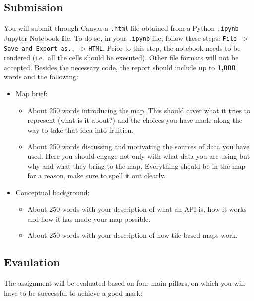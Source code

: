 \documentclass[
  letterpaper,
  DIV=11,
  numbers=noendperiod]{scrreprt}
\providecommand{\tightlist}{%
  \setlength{\itemsep}{0pt}\setlength{\parskip}{0pt}}\usepackage{longtable,booktabs,array}
\begin{document}
\subsection*{Submission}\label{submission}

You will submit through Canvas a \texttt{.html} file obtained from a
Python \texttt{.ipynb} Jupyter Notebook file. To do so, in your
\texttt{.ipynb} file, follow these steps: \texttt{File} --\textgreater{}
\texttt{Save\ and\ Export\ as..} --\textgreater{} \texttt{HTML}. Prior
to this step, the notebook needs to be rendered (i.e.~all the cells
should be executed). Other file formats will not be accepted. Besides
the necessary code, the report should include up to \textbf{1,000} words
and the following:

\begin{itemize}
\item
  Map brief:

  \begin{itemize}
  \tightlist
  \item
    About 250 words introducing the map. This should cover what it tries
    to represent (what is it about?) and the choices you have made along
    the way to take that idea into fruition.
  \item
    About 250 words discussing and motivating the sources of data you
    have used. Here you should engage not only with what data you are
    using but why and what they bring to the map. Everything should be
    in the map for a reason, make sure to spell it out clearly.
  \end{itemize}
\item
  Conceptual background:

  \begin{itemize}
  \tightlist
  \item
    About 250 words with your description of what an API is, how it
    works and how it has made your map possible.
  \item
    About 250 words with your description of how tile-based maps work.
  \end{itemize}
\end{itemize}

\subsection*{Evaulation}\label{evaulation}

The assignment will be evaluated based on four main pillars, on which
you will have to be successful to achieve a good mark:
\end{document}
